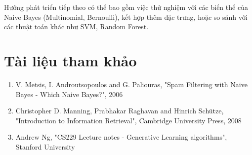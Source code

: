 Hướng phát triển tiếp theo có thể bao gồm việc thử nghiệm với các biến thể của Naive Bayes (Multinomial, Bernoulli), kết hợp thêm đặc trưng, hoặc so sánh với các thuật toán khác như SVM, Random Forest.

\section{Tài liệu tham khảo}

\begin{enumerate}
    \item V. Metsis, I. Androutsopoulos and G. Paliouras, "Spam Filtering with Naive Bayes - Which Naive Bayes?", 2006
    \item Christopher D. Manning, Prabhakar Raghavan and Hinrich Schütze, "Introduction to Information Retrieval", Cambridge University Press, 2008
    \item Andrew Ng, "CS229 Lecture notes - Generative Learning algorithms", Stanford University
\end{enumerate}
